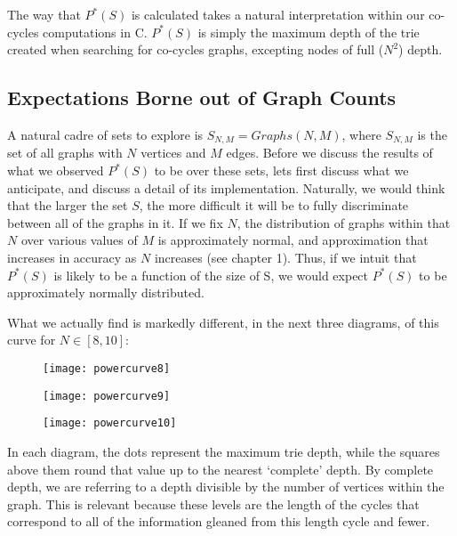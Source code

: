 The way that  $P^*(S)$ is calculated takes a natural interpretation within our co-cycles computations in C. 
 $P^*(S)$ is simply the maximum depth of the trie created when searching for co-cycles graphs, excepting nodes of full ($N^2$) depth.

\subsection{Expectations Borne out of Graph Counts}

A natural cadre of sets to explore is $S_{N, M} = Graphs(N, M)$, where $S_{N, M}$ is the set of all graphs with $N$ vertices and $M$ edges.
Before we discuss the results of what we observed $P^*(S)$ to be over these sets, lets first discuss what we anticipate, and discuss a detail of its implementation.
Naturally, we would think that the larger the set $S$, the more difficult it will be to fully discriminate between all of the graphs in it.
If we fix $N$, the distribution of graphs within that $N$ over various values of $M$ is approximately normal, and approximation that increases in accuracy as $N$ increases (see chapter 1).
Thus, if we intuit that $P^*(S)$ is likely to be a function of the size of S, we would expect $P^*(S)$ to be approximately normally distributed.

What we actually find is markedly different, in the next three diagrams, of this curve for $N \in [8, 10]$:

\begin{figure}[h]
\caption{}
\centering
\texttt{[image: powercurve8]}
\label{fig:powercurve8}
\end{figure}

\begin{figure}[h]
\caption{}
\centering
\texttt{[image: powercurve9]}
\label{fig:powercurve9}
\end{figure}

\begin{figure}[h]
\caption{}
\centering
\texttt{[image: powercurve10]}
\label{fig:powercurve10}
\end{figure}

In each diagram, the dots represent the maximum trie depth, while the squares above them round that value up to the nearest `complete' depth.
By complete depth, we are referring to a depth divisible by the number of vertices within the graph.
This is relevant because these levels are the length of the cycles that correspond to all of the information gleaned from this length cycle and fewer.

